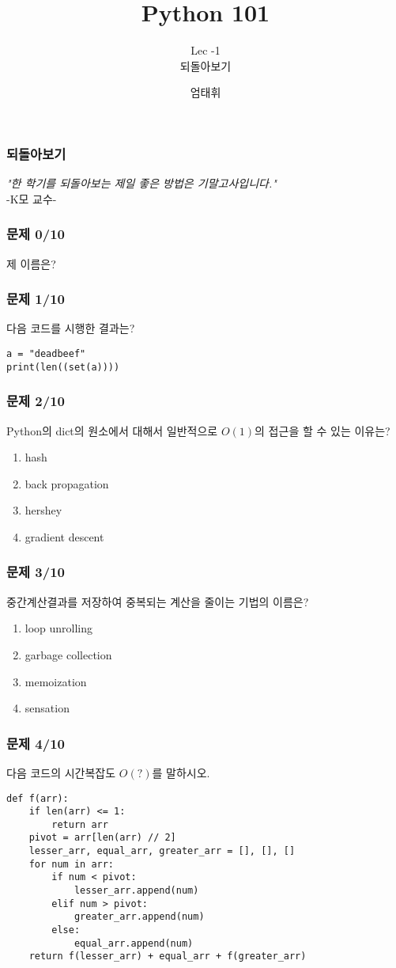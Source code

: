 \documentclass{beamer}
\title{Python 101}
\subtitle{Lec -1\\ 되돌아보기}
\author{엄태휘}
\begin{document}
\frame{\titlepage}

\begin{frame}
\frametitle{되돌아보기}
\textit{"한 학기를 되돌아보는 제일 좋은 방법은 기말고사입니다."}\\
-K모 교수-
\end{frame}

\begin{frame}
\frametitle{문제 0/10}
제 이름은?
\end{frame}

\begin{frame}[fragile]
\frametitle{문제 1/10}
다음 코드를 시행한 결과는?
\begin{lstlisting}
a = "deadbeef"
print(len((set(a))))
\end{lstlisting}
\end{frame}

\begin{frame}[fragile]
\frametitle{문제 2/10}
Python의 dict의 원소에서 대해서 일반적으로 $O(1)$의 접근을 할 수 있는 이유는?
\begin{enumerate}
  \item hash
  \item back propagation
  \item hershey
  \item gradient descent
\end{enumerate}
\end{frame}

\begin{frame}[fragile]
\frametitle{문제 3/10}
중간계산결과를 저장하여 중복되는 계산을 줄이는 기법의 이름은?
\begin{enumerate}
  \item loop unrolling
  \item garbage collection
  \item memoization
  \item sensation
\end{enumerate}
\end{frame}

\begin{frame}[fragile]
\frametitle{문제 4/10}
다음 코드의 시간복잡도 $O(?)$를 말하시오.
\begin{lstlisting}
def f(arr):
    if len(arr) <= 1:
        return arr
    pivot = arr[len(arr) // 2]
    lesser_arr, equal_arr, greater_arr = [], [], []
    for num in arr:
        if num < pivot:
            lesser_arr.append(num)
        elif num > pivot:
            greater_arr.append(num)
        else:
            equal_arr.append(num)
    return f(lesser_arr) + equal_arr + f(greater_arr)
\end{lstlisting}
\end{frame}
\end{document}
